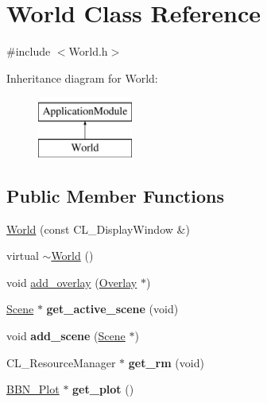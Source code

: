 \hypertarget{classWorld}{
\section{World Class Reference}
\label{classWorld}
}


{\ttfamily \#include $<$World.h$>$}

Inheritance diagram for World:\begin{figure}[H]
\begin{center}
\leavevmode
\includegraphics[height=2cm]{classWorld}
\end{center}
\end{figure}
\subsection*{Public Member Functions}
\begin{DoxyCompactItemize}
\item 
\hyperlink{classWorld_aab6a1bf824c9e827eafcc1e54a5f798a}{World} (const CL\_\-DisplayWindow \&)
\item 
virtual \hyperlink{classWorld_a8c73fba541a5817fff65147ba47cd827}{$\sim$World} ()
\item 
void \hyperlink{classWorld_a6f50eb99577e175c5019567418141dad}{add\_\-overlay} (\hyperlink{classOverlay}{Overlay} $\ast$)
\item 
\hypertarget{classWorld_ae7c0d7013c83bebe79c292a9df93dbac}{
\hyperlink{classScene}{Scene} $\ast$ {\bfseries get\_\-active\_\-scene} (void)}
\label{classWorld_ae7c0d7013c83bebe79c292a9df93dbac}

\item 
\hypertarget{classWorld_a5436387064a84be30661204f0c27fb1b}{
void {\bfseries add\_\-scene} (\hyperlink{classScene}{Scene} $\ast$)}
\label{classWorld_a5436387064a84be30661204f0c27fb1b}

\item 
\hypertarget{classWorld_ac0eb26fc1a66dcec1c82ffc3e076cd01}{
CL\_\-ResourceManager $\ast$ {\bfseries get\_\-rm} (void)}
\label{classWorld_ac0eb26fc1a66dcec1c82ffc3e076cd01}

\item 
\hypertarget{classWorld_afd13f88c50f620ac8ec7f92d6e21d798}{
\hyperlink{classBBN__Plot}{BBN\_\-Plot} $\ast$ {\bfseries get\_\-plot} ()}
\label{classWorld_afd13f88c50f620ac8ec7f92d6e21d798}

\end{DoxyCompactItemize}


